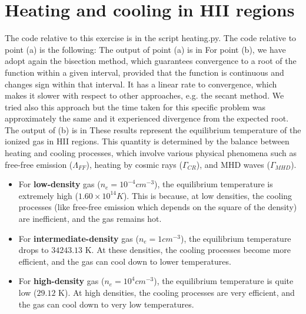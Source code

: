 \section{Heating and cooling in HII regions}
The code relative to this exercise is in the script heating.py. The code relative to point (a) is the following:  The output of point (a) is in  For point (b), we have adopt again the bisection method, which guarantees convergence to a root of the function within a given interval, provided that the function is continuous and changes sign within that interval. It has a linear rate to convergence, which makes it slower with respect to other approaches, e.g. the secant method. We tried also this approach but the time taken for this specific problem was approximately the same and it experienced divergence from the expected root. The output of (b) is in 
These results represent the equilibrium temperature of the ionized gas in HII regions. This quantity is determined by the balance between heating and cooling processes, which involve various physical phenomena such as free-free emission ($\Lambda_{FF}$), heating by cosmic rays ($\Gamma_{CR}$), and MHD waves ($\Gamma_{MHD}$).
\begin{itemize}
  \item For \textbf{low-density} gas ($n_{e} = 10^{-4} cm^{-3}$), the equilibrium temperature is extremely high ($1.60 \times 10^{14} K$). This is because, at low densities, the cooling processes (like free-free emission which depends on the square of the density) are inefficient, and the gas remains hot.
  \item For \textbf{intermediate-density} gas ($n_{e} = 1 cm^{-3}$), the equilibrium temperature drops to $34243.13$ K. At these densities, the cooling processes become more efficient, and the gas can cool down to lower temperatures.
  \item For \textbf{high-density} gas ($n_{e} = 10^{4} cm^{-3}$), the equilibrium temperature is quite low ($29.12$ K). At high densities, the cooling processes are very efficient, and the gas can cool down to very low temperatures.
\end{itemize}


